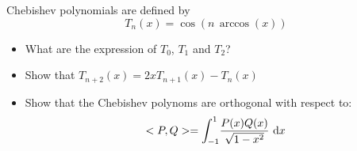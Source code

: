 \bexo
Chebishev polynomials are defined by 
$$ T_n(x)=\cos(n\,\arccos(x))$$

\begin{itemize}
	\item What are the expression of $T_0$, $T_1$ and $T_2$?
	\item Show that $T_{n+2}(x)=2xT_{n+1}(x)-T_n(x)$
	\item Show that the Chebishev polynoms are orthogonal with respect to:
$$
<P,Q>=\displaystyle{\int_{-1}^1} \dfrac{P(x)Q(x)}{\sqrt{1-x^2}}\,\,\textrm{d} x
$$
\end{itemize}




\eexo
{}